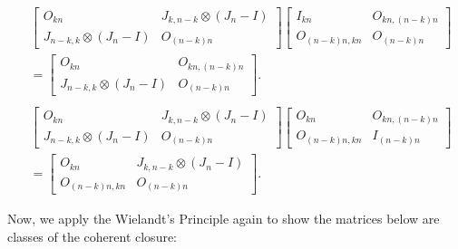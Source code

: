 \begin{align*}
    &\begin{bmatrix}
        O_{kn} & J_{k,n-k} \otimes (J_n-I) \\
        J_{n-k,k}\otimes (J_n-I) & O_{(n-k)n}
    \end{bmatrix}\begin{bmatrix}
        I_{kn} & O_{kn, (n-k)n} \\
        O_{(n-k)n,kn} & O_{(n-k)n}
    \end{bmatrix}\\
    &=\begin{bmatrix}
        O_{kn} & O_{kn, (n-k)n} \\
        J_{n-k,k}\otimes (J_n-I) & O_{(n-k)n}
    \end{bmatrix}.\\\\
    &\begin{bmatrix}
        O_{kn} & J_{k,n-k} \otimes (J_n-I) \\
        J_{n-k,k}\otimes (J_n-I) & O_{(n-k)n}
    \end{bmatrix}\begin{bmatrix}
        O_{kn} & O_{kn, (n-k)n} \\
        O_{(n-k)n,kn} & I_{(n - k)n}
    \end{bmatrix}\\
    &= \begin{bmatrix}
        O_{kn} & J_{k,n-k} \otimes (J_n-I) \\
        O_{(n-k)n,kn} & O_{(n-k)n}
    \end{bmatrix}.
\end{align*}

Now, we apply the Wielandt's Principle again to show the matrices below are classes of the coherent closure:

